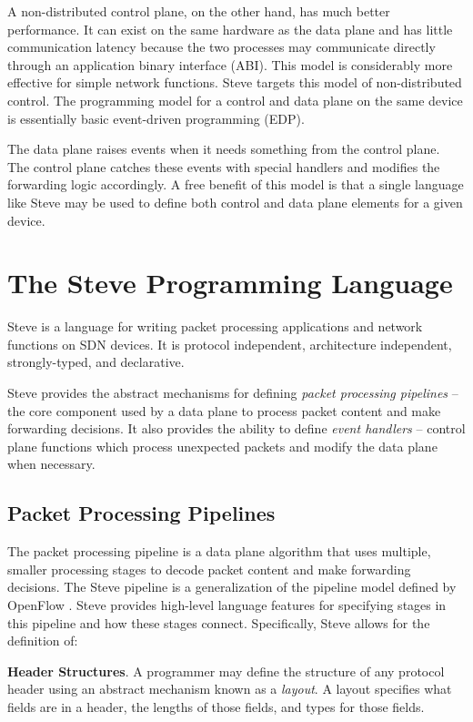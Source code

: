 A non-distributed control plane, on the other hand, has much
better performance.
It can exist on the
same hardware as the data plane and has little communication latency
because the two processes may communicate directly through an application
binary interface (ABI).
This model is considerably more effective for simple network functions.
Steve targets this model of non-distributed control.
The programming model for a control and data plane on the same device
is essentially basic event-driven programming (EDP).

The data plane raises events when it needs something from the control plane.
The control plane catches these events with special handlers and modifies the
forwarding logic accordingly.
A free benefit of this model is that a single language like Steve may
be used to define both control and data plane elements for a given 
device. 
 
\section{The Steve Programming Language}

Steve is a language for writing packet processing applications
and network functions on SDN devices.
It is protocol independent, architecture independent, strongly-typed,
and declarative.

Steve provides the abstract mechanisms for defining \emph{packet
processing pipelines} -- the core component used by a data plane
to process packet content and make forwarding decisions.
It also provides the ability to define \emph{event handlers} --
control plane functions which process unexpected packets and
modify the data plane when necessary.

\subsection{Packet Processing Pipelines}

The packet processing pipeline is a data plane algorithm that
uses multiple, smaller processing stages to decode packet content and make
forwarding decisions.
The Steve pipeline is a generalization
of the pipeline model defined by OpenFlow \cite{openflow_spec}.
Steve provides high-level language features for specifying
stages in this pipeline and how these stages connect.
Specifically, Steve allows for the definition of:

\textbf{Header Structures}.
A programmer may define the structure of any protocol header using an abstract
mechanism known as a \emph{layout}.
A layout specifies what fields are in a header, the lengths of those fields,
and types for those fields.

